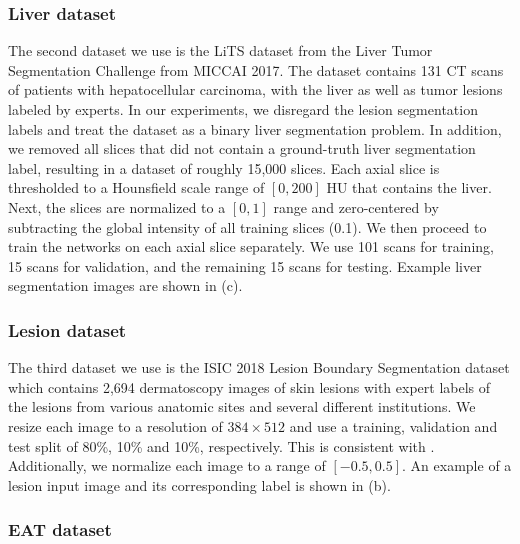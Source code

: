       \subsubsection{Liver dataset}

The second dataset we use is the LiTS dataset \cite{bilicLiverTumorSegmentation2019} from the Liver Tumor Segmentation Challenge from MICCAI 2017. The dataset contains 131 CT scans of patients with hepatocellular carcinoma, with the liver as well as tumor lesions labeled by experts. In our experiments, we disregard the lesion segmentation labels and treat the dataset as a binary liver segmentation problem. In addition, we removed all slices that did not contain a ground-truth liver segmentation label, resulting in a dataset of roughly 15,000 slices. Each axial slice is thresholded to a Hounsfield scale range of $[0, 200]$ HU that contains the liver. Next, the slices are normalized to a $[0, 1]$ range and zero-centered by subtracting the global intensity of all training slices (0.1). We then proceed to train the networks on each axial slice separately. We use 101 scans for training, 15 scans for validation, and the remaining 15 scans for testing. Example liver segmentation images are shown in (c).

      \subsubsection{Lesion dataset}

The third dataset we use is the ISIC 2018 Lesion Boundary Segmentation dataset 
\cite{codellaSkinLesionAnalysis2018, tschandlHAM10000DatasetLarge2018} which contains 2,694 dermatoscopy 
images of skin lesions with expert labels of the lesions from various anatomic sites and several different 
institutions. We resize each image to a 
resolution of $384 \times 512$ and use a training, validation and test split of 80\%, 10\% and 10\%, 
respectively. This is consistent with \cite{jhaDoubleUNetDeepConvolutional2020}. Additionally, we normalize 
each image to a range of $[-0.5, 0.5]$. An example of a lesion 
input image and its corresponding label is shown in (b).
	
      \subsubsection{EAT dataset}

